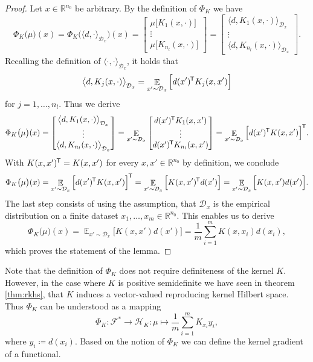 \documentclass[11pt, a4paper]{article}
\newcommand{\R}{\mathbb{R}}
\newcommand{\D}{\mathcal{D}}
\newcommand{\F}{\mathcal{F}}
\renewcommand{\H}{\mathcal{H}}
\newcommand*{\tr}{^{\mkern-1.5mu\mathsf{T}}}
\DeclareMathOperator*{\E}{\mathbb{E}}
\begin{document}
\begin{proof}
Let $x \in \R^{n_0}$ be arbitrary. By the definition of $\Phi_K$ we have
\[ \Phi_K \big ( \mu \big )(x) = \Phi_K \Big ( \langle d, \cdot \rangle_{\D_x} \Big )(x) = \begin{bmatrix} \mu \big [K_1(x,\cdot) \big ] \\ \vdots \\ \mu \big [ K_{n_l}(x,\cdot) \big ] \end{bmatrix} = \begin{bmatrix} \big \langle d, K_1(x,\cdot) \big \rangle_{\D_x} \\ \vdots \\ \big \langle d, K_{n_l}(x,\cdot) \big \rangle_{\D_x} \end{bmatrix}. \]
Recalling the definition of $\langle \cdot , \cdot \rangle_{\D_x}$, it holds that
\[ \big \langle d, K_j(x,\cdot) \big \rangle_{\D_x} = \E_{x' \sim \D_x} \Big [ d(x')\tr K_j(x,x') \Big ] \]
for $j = 1, \dots, n_l$. Thus we derive
\[ \Phi_K \big ( \mu \big )(x) = \begin{bmatrix} \big \langle d, K_1(x,\cdot) \big \rangle_{\D_x} \\ \vdots \\ \big \langle d, K_{n_l}(x,\cdot) \big \rangle_{\D_x} \end{bmatrix} = \E_{x' \sim \D_x} \begin{bmatrix} d(x')\tr K_{1}(x,x') \\ \vdots \\ d(x')\tr K_{n_l}(x,x') \end{bmatrix} = \E_{x' \sim \D_x} \Big [ d(x')\tr  K(x,x') \Big ]\tr . \]
With $K(x,x')\tr  = K(x,x')$ for every $x,x' \in \R^{n_0}$ by definition, we conclude
\[ \Phi_K \big ( \mu \big )(x) = \E_{x' \sim \D_x} \Big [ d(x')\tr  K(x,x') \Big ]\tr  = \E_{x' \sim \D_x} \Big [ K(x,x')\tr d(x') \Big ] = \E_{x' \sim \D_x} \Big [ K(x,x')d(x') \Big ]. \]
The last step consists of using the assumption, that $\D_x$ is the empirical distribution on a finite dataset $x_1, \dots, x_m \in \R^{n_0}$. This enables us to derive
\[ \Phi_K \big ( \mu \big )(x) = \E_{x' \sim \D_x} \Big [ K(x,x')d(x') \Big ] = \frac{1}{m}\sum_{i=1}^{m} K(x,x_i)d(x_i), \]
which proves the statement of the lemma.
\end{proof}

Note that the definition of $\Phi_K$ does not require definiteness of the kernel $K$. However, in the case where $K$ is positive semidefinite we have seen in theorem \ref{thm:rkhs}, that $K$ induces a vector-valued reproducing kernel Hilbert space. Thus $\Phi_K$ can be understood as a mapping
\[ \Phi_K: \F^* \to \H_K : \mu \mapsto \frac{1}{m} \sum_{i=1}^{m} K_{x_i}y_i, \]
where $y_i \coloneq d(x_i)$. Based on the notion of $\Phi_K$ we can define the kernel gradient of a functional.
\end{document}
